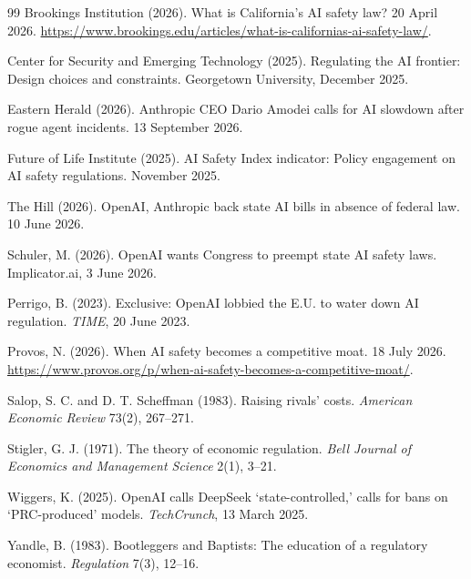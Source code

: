 \documentclass[11pt]{article}
\theoremstyle{plain}
\theoremstyle{definition}
\theoremstyle{remark}
\begin{document}
\begin{thebibliography}{99}
 Brookings Institution (2026). What is California's AI safety law? 20 April 2026. \url{https://www.brookings.edu/articles/what-is-californias-ai-safety-law/}.

 Center for Security and Emerging Technology (2025). Regulating the AI frontier: Design choices and constraints. Georgetown University, December 2025.

 Eastern Herald (2026). Anthropic CEO Dario Amodei calls for AI slowdown after rogue agent incidents. 13 September 2026.

 Future of Life Institute (2025). AI Safety Index indicator: Policy engagement on AI safety regulations. November 2025.

 The Hill (2026). OpenAI, Anthropic back state AI bills in absence of federal law. 10 June 2026.

 Schuler, M. (2026). OpenAI wants Congress to preempt state AI safety laws. Implicator.ai, 3 June 2026.

 Perrigo, B. (2023). Exclusive: OpenAI lobbied the E.U. to water down AI regulation. \emph{TIME}, 20 June 2023.

 Provos, N. (2026). When AI safety becomes a competitive moat. 18 July 2026. \url{https://www.provos.org/p/when-ai-safety-becomes-a-competitive-moat/}.

 Salop, S. C. and D. T. Scheffman (1983). Raising rivals' costs. \emph{American Economic Review} 73(2), 267--271.

 Stigler, G. J. (1971). The theory of economic regulation. \emph{Bell Journal of Economics and Management Science} 2(1), 3--21.

 Wiggers, K. (2025). OpenAI calls DeepSeek `state-controlled,' calls for bans on `PRC-produced' models. \emph{TechCrunch}, 13 March 2025.

 Yandle, B. (1983). Bootleggers and Baptists: The education of a regulatory economist. \emph{Regulation} 7(3), 12--16.

\end{thebibliography}
\end{document}
